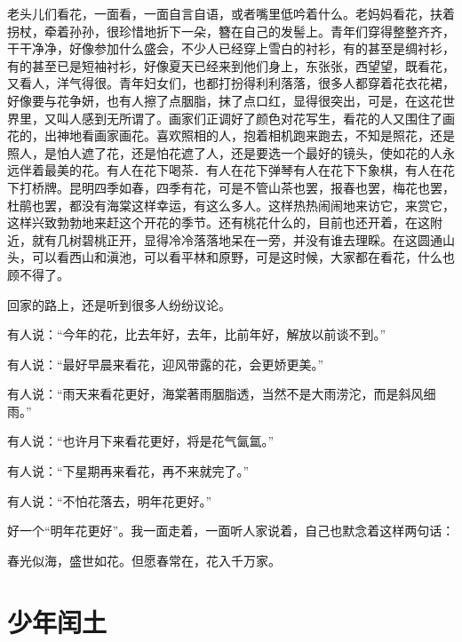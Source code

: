 \documentclass[12pt,UTF-8,openany]{ctexbook}
\begin{document}
\begin{large}
    老头儿们看花，一面看，一面自言自语，或者嘴里低吟着什么。老妈妈看花，扶着拐杖，牵着孙孙，很珍惜地折下一朵，簪在自己的发髻上。青年们穿得整整齐齐，干干净净，好像参加什么盛会，不少人已经穿上雪白的衬衫，有的甚至是绸衬衫，有的甚至已是短袖衬衫，好像夏天已经来到他们身上，东张张，西望望，既看花，又看人，洋气得很。青年妇女们，也都打扮得利利落落，很多人都穿着花衣花裙，好像要与花争妍，也有人擦了点胭脂，抹了点口红，显得很突出，可是，在这花世界里，又叫人感到无所谓了。画家们正调好了颜色对花写生，看花的人又围住了画花的，出神地看画家画花。喜欢照相的人，抱着相机跑来跑去，不知是照花，还是照人，是怕人遮了花，还是怕花遮了人，还是要选一个最好的镜头，使如花的人永远伴着最美的花。有人在花下喝茶．有人在花下弹琴有人在花下下象棋，有人在花下打桥牌。昆明四季如春，四季有花，可是不管山茶也罢，报春也罢，梅花也罢，杜鹃也罢，都没有海棠这样幸运，有这么多人。这样热热闹闹地来访它，来赏它，这样兴致勃勃地来赶这个开花的季节。还有桃花什么的，目前也还开着，在这附近，就有几树碧桃正开，显得冷冷落落地呆在一旁，并没有谁去理睬。在这圆通山头，可以看西山和滇池，可以看平林和原野，可是这时候，大家都在看花，什么也顾不得了。
    
    回家的路上，还是听到很多人纷纷议论。
    
    有人说：“今年的花，比去年好，去年，比前年好，解放以前谈不到。”
    
    有人说：“最好早晨来看花，迎风带露的花，会更娇更美。”
    
    有人说：“雨天来看花更好，海棠著雨胭脂透，当然不是大雨涝沱，而是斜风细雨。”
    
    有人说：“也许月下来看花更好，将是花气氤氲。”
    
    有人说：“下星期再来看花，再不来就完了。”
    
    有人说：“不怕花落去，明年花更好。”
    
    好一个“明年花更好”。我一面走着，一面听人家说着，自己也默念着这样两句话：
    
    春光似海，盛世如花。但愿春常在，花入千万家。
    
\end{large}



\chapter{少年闰土}
\end{document}
